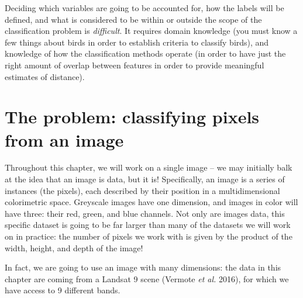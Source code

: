 \documentclass[
  letterpaper,
]{scrbook}
\begin{document}
Deciding which variables are going to be accounted for, how the labels
will be defined, and what is considered to be within or outside the
scope of the classification problem is \emph{difficult}. It requires
domain knowledge (you must know a few things about birds in order to
establish criteria to classify birds), and knowledge of how the
classification methods operate (in order to have just the right amount
of overlap between features in order to provide meaningful estimates of
distance).

\section{The problem: classifying pixels from an
image}\label{the-problem-classifying-pixels-from-an-image}

Throughout this chapter, we will work on a single image -- we may
initially balk at the idea that an image is data, but it is!
Specifically, an image is a series of instances (the pixels), each
described by their position in a multidimensional colorimetric space.
Greyscale images have one dimension, and images in color will have
three: their red, green, and blue channels. Not only are images data,
this specific dataset is going to be far larger than many of the
datasets we will work on in practice: the number of pixels we work with
is given by the product of the width, height, and depth of the image!

In fact, we are going to use an image with many dimensions: the data in
this chapter are coming from a Landsat 9 scene (Vermote \emph{et al.}
2016), for which we have access to 9 different bands.
\end{document}
